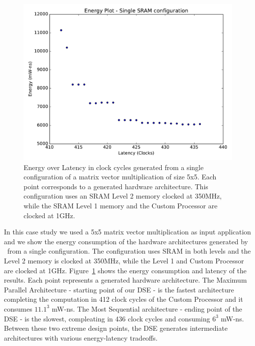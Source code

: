 \begin{figure}[tb] 
\centering
\includegraphics[width=\columnwidth]{graphs/energy_plot_single_sram.pdf}
\caption{\small Energy over Latency in clock cycles generated from a single configuration of a matrix vector multiplication of size 5x5. Each point corresponds to a generated hardware architecture. This configuration uses an SRAM Level 2 memory clocked at 350MHz, while the SRAM Level 1 memory and the Custom Processor are clocked at 1GHz.}
\label{fig:single_sram}
\end{figure}
In this case study we used a 5x5 matrix vector multiplication as input application and we show the energy consumption of the hardware architectures generated by \frameworkname~from a single configuration. The configuration uses SRAM in both levels and the Level 2 memory is clocked at 350MHz, while the Level 1 and Custom Processor are clocked at 1GHz. Figure~\ref{fig:single_sram} shows the energy consumption and latency of the results. Each point represents a generated hardware architecture. The Maximum Parallel Architecture - starting point of our DSE - is the fastest architecture completing the computation in 412 clock cycles of the Custom Processor and it consumes $11.1^3$ mW-ns. The Most Sequential architecture - ending point of the DSE - is the slowest, compleating in 436 clock cycles and consuming $6^3$ mW-ns. Between these two extreme design points, the DSE generates intermediate architectures with various energy-latency tradeoffs. 


